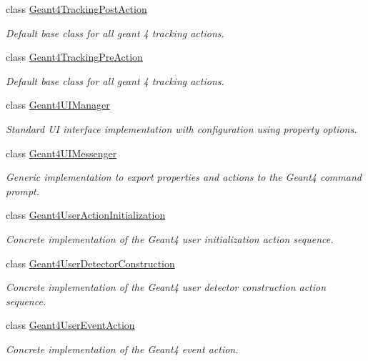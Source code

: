 \begin{DoxyCompactItemize}
class \hyperlink{class_d_d4hep_1_1_simulation_1_1_geant4_tracking_post_action}{Geant4\+Tracking\+Post\+Action}
\begin{DoxyCompactList}\small\item\em Default base class for all geant 4 tracking actions. \end{DoxyCompactList}\item 
class \hyperlink{class_d_d4hep_1_1_simulation_1_1_geant4_tracking_pre_action}{Geant4\+Tracking\+Pre\+Action}
\begin{DoxyCompactList}\small\item\em Default base class for all geant 4 tracking actions. \end{DoxyCompactList}\item 
class \hyperlink{class_d_d4hep_1_1_simulation_1_1_geant4_u_i_manager}{Geant4\+U\+I\+Manager}
\begin{DoxyCompactList}\small\item\em Standard UI interface implementation with configuration using property options. \end{DoxyCompactList}\item 
class \hyperlink{class_d_d4hep_1_1_simulation_1_1_geant4_u_i_messenger}{Geant4\+U\+I\+Messenger}
\begin{DoxyCompactList}\small\item\em Generic implementation to export properties and actions to the Geant4 command prompt. \end{DoxyCompactList}\item 
class \hyperlink{class_d_d4hep_1_1_simulation_1_1_geant4_user_action_initialization}{Geant4\+User\+Action\+Initialization}
\begin{DoxyCompactList}\small\item\em Concrete implementation of the Geant4 user initialization action sequence. \end{DoxyCompactList}\item 
class \hyperlink{class_d_d4hep_1_1_simulation_1_1_geant4_user_detector_construction}{Geant4\+User\+Detector\+Construction}
\begin{DoxyCompactList}\small\item\em Concrete implementation of the Geant4 user detector construction action sequence. \end{DoxyCompactList}\item 
class \hyperlink{class_d_d4hep_1_1_simulation_1_1_geant4_user_event_action}{Geant4\+User\+Event\+Action}
\begin{DoxyCompactList}\small\item\em Concrete implementation of the Geant4 event action. \end{DoxyCompactList}\item 

\end{DoxyCompactItemize}

